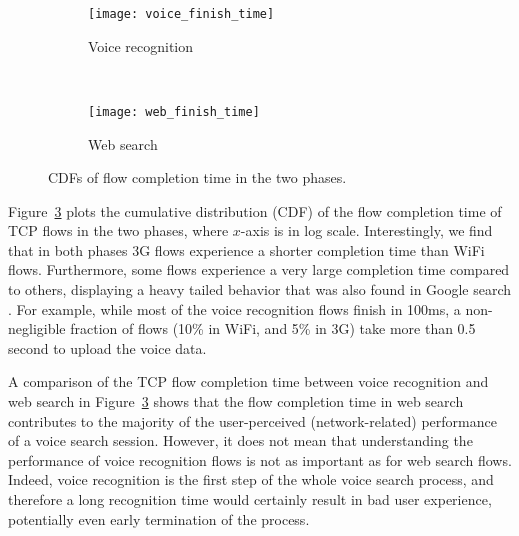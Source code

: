 \begin{figure}[t]
\centering
\begin{subfigure}[b]{0.8\linewidth}
	\texttt{[image: voice\_finish\_time]}
\caption{Voice recognition}
\label{fig:voice_finish_time}
\end{subfigure} \\
\begin{subfigure}[b]{0.8\linewidth}
	\texttt{[image: web\_finish\_time]}
\caption{Web search}
\label{fig:web_finish_time}
\end{subfigure}
\caption{CDFs of flow completion time in the two phases.}
\label{fig:finish_time}
\minsqueeze
\end{figure}


Figure~\ref{fig:finish_time} plots the cumulative distribution (CDF) of the flow completion time of TCP flows in the two phases, where $x$-axis is in log scale. Interestingly, we find that in both phases 3G flows experience a shorter completion time than WiFi flows. Furthermore, some flows experience a very large completion time compared to others, displaying a heavy tailed behavior that was also found in Google search \cite{flach2013reducing}. For example, while most of the voice recognition flows finish in 100ms, a non-negligible fraction of flows (10\% in WiFi, and 5\% in 3G) take more than 0.5 second to upload the voice data. 


A comparison of the TCP flow completion time between voice recognition and web search in Figure~\ref{fig:finish_time} shows that the flow completion time in web search contributes to the majority of the user-perceived (network-related) performance of a voice search session. However, it does not mean that understanding the performance of voice recognition flows is not as important as for web search flows. Indeed, voice recognition is the first step of the whole voice search process, and therefore a long recognition time would certainly result in bad user experience, potentially even early termination of the process.

